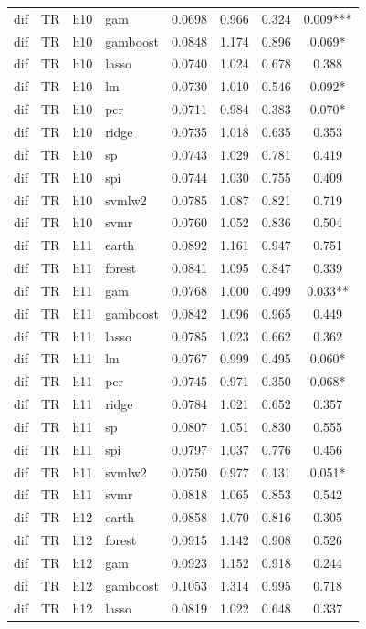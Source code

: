 \begin{ThreePartTable}
\begin{longtable}[t]{llclcccc}
dif & TR & h10 & gam & 0.0698 & 0.966 & 0.324 & 0.009***\\
dif & TR & h10 & gamboost & 0.0848 & 1.174 & 0.896 & 0.069*\\
dif & TR & h10 & lasso & 0.0740 & 1.024 & 0.678 & 0.388\\
dif & TR & h10 & lm & 0.0730 & 1.010 & 0.546 & 0.092*\\
dif & TR & h10 & pcr & 0.0711 & 0.984 & 0.383 & 0.070*\\
dif & TR & h10 & ridge & 0.0735 & 1.018 & 0.635 & 0.353\\
dif & TR & h10 & sp & 0.0743 & 1.029 & 0.781 & 0.419\\
dif & TR & h10 & spi & 0.0744 & 1.030 & 0.755 & 0.409\\
dif & TR & h10 & svmlw2 & 0.0785 & 1.087 & 0.821 & 0.719\\
dif & TR & h10 & svmr & 0.0760 & 1.052 & 0.836 & 0.504\\
\addlinespace
dif & TR & h11 & earth & 0.0892 & 1.161 & 0.947 & 0.751\\
dif & TR & h11 & forest & 0.0841 & 1.095 & 0.847 & 0.339\\
dif & TR & h11 & gam & 0.0768 & 1.000 & 0.499 & 0.033**\\
dif & TR & h11 & gamboost & 0.0842 & 1.096 & 0.965 & 0.449\\
dif & TR & h11 & lasso & 0.0785 & 1.023 & 0.662 & 0.362\\
dif & TR & h11 & lm & 0.0767 & 0.999 & 0.495 & 0.060*\\
dif & TR & h11 & pcr & 0.0745 & 0.971 & 0.350 & 0.068*\\
dif & TR & h11 & ridge & 0.0784 & 1.021 & 0.652 & 0.357\\
dif & TR & h11 & sp & 0.0807 & 1.051 & 0.830 & 0.555\\
dif & TR & h11 & spi & 0.0797 & 1.037 & 0.776 & 0.456\\
dif & TR & h11 & svmlw2 & 0.0750 & 0.977 & 0.131 & 0.051*\\
dif & TR & h11 & svmr & 0.0818 & 1.065 & 0.853 & 0.542\\
\addlinespace
dif & TR & h12 & earth & 0.0858 & 1.070 & 0.816 & 0.305\\
dif & TR & h12 & forest & 0.0915 & 1.142 & 0.908 & 0.526\\
dif & TR & h12 & gam & 0.0923 & 1.152 & 0.918 & 0.244\\
dif & TR & h12 & gamboost & 0.1053 & 1.314 & 0.995 & 0.718\\
dif & TR & h12 & lasso & 0.0819 & 1.022 & 0.648 & 0.337\\

\end{longtable}
\end{ThreePartTable}
